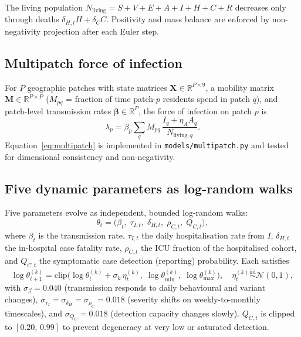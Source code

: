 \documentclass[11pt]{article}
\begin{document}
The living population $N_{\mathrm{living}}=S+V+E+A+I+H+C+R$ decreases only
through deaths $\delta_{H,t}H+\delta_C C$.
Positivity and mass balance are enforced by non-negativity projection after
each Euler step.

\subsection{Multipatch force of infection}
\label{sec:multipatch}

For $P$ geographic patches with state matrices
$\bm{X}\in\mathbb{R}^{P\times 9}$, a mobility matrix
$\bm{M}\in\mathbb{R}^{P\times P}$ ($M_{pq}$ = fraction of time patch-$p$
residents spend in patch $q$), and patch-level transmission rates
$\bm{\beta}\in\mathbb{R}^P$, the force of infection on patch $p$ is
\begin{equation}
  \lambda_p = \beta_p \sum_q M_{pq}\,
  \frac{I_q + \eta_A A_q}{N_{\mathrm{living},q}}.
  \label{eq:multipatch}
\end{equation}
Equation~\eqref{eq:multipatch} is implemented in
\texttt{models/multipatch.py} and tested for dimensional consistency
and non-negativity.

\subsection{Five dynamic parameters as log-random walks}
\label{sec:dynamic}

Five parameters evolve as independent, bounded log-random walks:
\begin{equation}
  \theta_t = \bigl(\beta_t,\;\tau_{I,t},\;\delta_{H,t},\;\rho_{C,t},\;Q_{C,t}\bigr),
\end{equation}
where $\beta_t$ is the transmission rate, $\tau_{I,t}$ the daily
hospitalisation rate from $I$, $\delta_{H,t}$ the in-hospital case fatality
rate, $\rho_{C,t}$ the ICU fraction of the hospitalised cohort, and
$Q_{C,t}$ the symptomatic case detection (reporting) probability.
Each satisfies
\begin{equation}
  \log\theta_{t+1}^{(k)} = \mathrm{clip}\!\bigl(
    \log\theta_t^{(k)} + \sigma_k\,\eta_t^{(k)},\;
    \log\theta_{\min}^{(k)},\;\log\theta_{\max}^{(k)}\bigr),
  \quad \eta_t^{(k)}\overset{\mathrm{iid}}{\sim}\mathcal{N}(0,1),
  \label{eq:logRW}
\end{equation}
with $\sigma_\beta=0.040$ (transmission responds to daily behavioural
and variant changes),
$\sigma_{\tau_I}=\sigma_{\delta_H}=\sigma_{\rho_C}=0.018$
(severity shifts on weekly-to-monthly timescales), and
$\sigma_{Q_C}=0.018$ (detection capacity changes slowly).
$Q_{C,t}$ is clipped to $[0.20,\,0.99]$ to prevent degeneracy at very low
or saturated detection.
\end{document}

